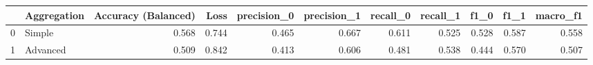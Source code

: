 \begin{tabular}{llrrrrrrrrr}
\toprule
 & Aggregation & Accuracy (Balanced) & Loss & precision_0 & precision_1 & recall_0 & recall_1 & f1_0 & f1_1 & macro_f1 \\
\midrule
0 & Simple & 0.568 & 0.744 & 0.465 & 0.667 & 0.611 & 0.525 & 0.528 & 0.587 & 0.558 \\
1 & Advanced & 0.509 & 0.842 & 0.413 & 0.606 & 0.481 & 0.538 & 0.444 & 0.570 & 0.507 \\
\bottomrule
\end{tabular}
